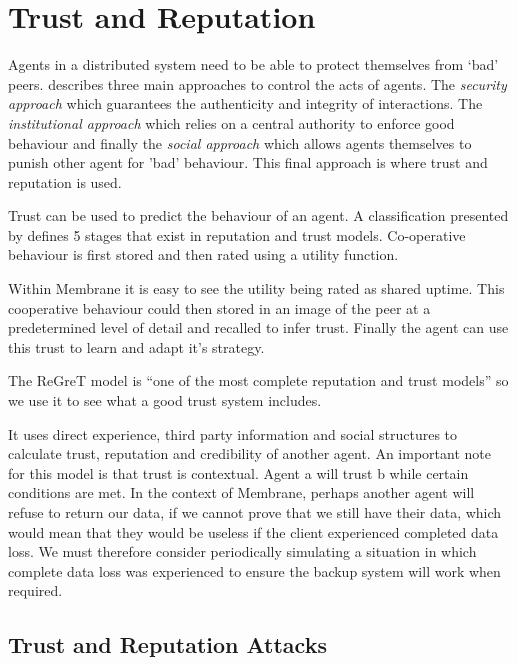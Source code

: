 \documentclass[11pt, a4paper, twocolumn, twoside]{report}
\begin{document}
\section{Trust and Reputation}

Agents in a distributed system need to be able to protect themselves from `bad' peers. \cite{pinyol2013computational} describes three main approaches to control the acts of agents. The \emph{security approach} which guarantees the authenticity and integrity of interactions. The \emph{institutional approach} which relies on a central authority to enforce good behaviour and finally the \emph{social approach} which allows agents themselves to punish other agent for 'bad' behaviour. This final approach is where trust and reputation is used.

Trust can be used to predict the behaviour of an agent. \citep{wooldridge2009introduction} A classification presented by \cite{balke2009using} defines 5 stages that exist in reputation and trust models. Co-operative behaviour is first stored and then rated using a utility function.

Within Membrane it is easy to see the utility being rated as shared uptime. This cooperative behaviour could then stored in an image of the peer at a predetermined level of detail and recalled to infer trust. Finally the agent can use this trust to learn and adapt it's strategy.

The ReGreT model \citep{sabater2001regret} is ``one of the most complete reputation and trust models'' \citep{pinyol2013computational} so we use it to see what a good trust system includes.

It uses direct experience, third party information and social structures to calculate trust, reputation and credibility of another agent. An important note for this model is that trust is contextual. Agent a will trust b while certain conditions are met. In the context of Membrane, perhaps another agent will refuse to return our data, if we cannot prove that we still have their data, which would mean that they would be useless if the client experienced completed data loss. We must therefore consider periodically simulating a situation in which complete data loss was experienced to ensure the backup system will work when required.

\subsection{Trust and Reputation Attacks} \label{sec:tar}
\end{document}
